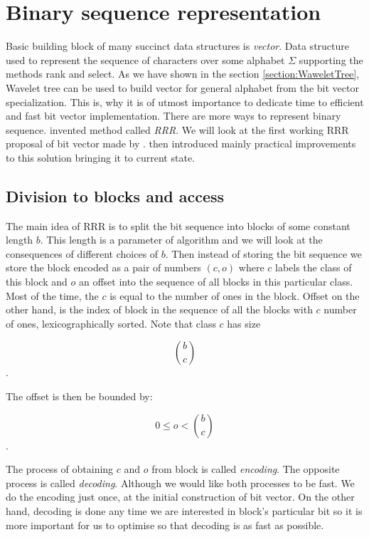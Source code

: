 \chapter{Binary sequence representation}
\label{kap:kap2}

Basic building block of many succinct data structures is \textit{vector}. Data structure
used to represent the sequence of characters over some alphabet $\Sigma$ supporting the
methods rank and select. As we
have shown in the section \ref{section:WaweletTree}, Wavelet tree can be used to
build vector for general alphabet from the bit vector specialization. This is, why
it is of utmost importance to dedicate time to efficient and fast bit vector
implementation. There are more ways to represent binary sequence. \cite{raman2007succinct}
invented method called \textit{RRR}. We will look at the first working RRR proposal
of bit vector made by \cite{claude2008practical}. \cite{navarro2012fast} then introduced
mainly practical improvements to this solution bringing it to current state.

\section{Division to blocks and access}

The main idea of RRR is to split the bit sequence into blocks of some constant
length $b$. This length is a parameter of algorithm and we will look at the consequences
of different choices of $b$. Then instead of storing the bit sequence we store the
block encoded as a pair of numbers $(c, o)$ where $c$ labels the class of this
block and $o$ an offset into the sequence of all blocks in this particular class.
Most of the time, the $c$ is equal to the number of ones in the block. Offset on
the other hand, is the index of block in the sequence of all the blocks with $c$ number
of ones, lexicographically sorted. Note that class $c$ has size

                $${b\choose c}$$.

The offset is then be bounded by:

				$$0 \leq o < {b\choose c}$$.

The process of obtaining $c$ and $o$ from block is called \textit{encoding}.
The opposite process is called \textit{decoding}. Although we would like both
processes to be fast. We do the encoding just once, at the initial construction
of bit vector. On the other hand, decoding is done any time we are interested in
block's particular bit so it is more important for us to optimise so that decoding
is as fast as possible.

